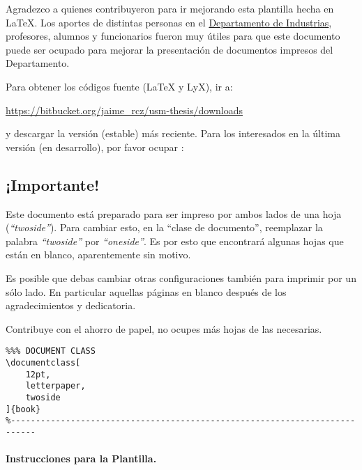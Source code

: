 
	Agradezco a quienes contribuyeron para ir mejorando esta plantilla hecha en \LaTeX{}. Los aportes de distintas personas en el \href{http://www.industrias.usm.cl}{Departamento de Industrias}, profesores, alumnos y funcionarios fueron muy útiles para que este documento puede ser ocupado para mejorar la presentación de documentos impresos del Departamento.

	Para obtener los códigos fuente (\LaTeX{} y LyX), ir a:
	
	\url{https://bitbucket.org/jaime_rcz/usm-thesis/downloads}
	
	y descargar la versión (estable) más reciente. Para los interesados en la última versión (en desarrollo), por favor ocupar :
	


\subsection*{\color{red}¡Importante!}
Este documento está preparado para ser impreso por ambos lados de una hoja (\emph{``twoside''}). Para cambiar esto, en la ``clase de documento'', reemplazar la palabra \emph{``twoside''} por \emph{``oneside''}. Es por esto que encontrará algunas hojas que están en blanco, aparentemente sin motivo.

Es posible que debas cambiar otras configuraciones también para imprimir por un sólo lado. En particular aquellas páginas en blanco después de los agradecimientos y dedicatoria.

Contribuye con el ahorro de papel, no ocupes más hojas de las necesarias.

\begin{Verbatim}[frame=lines, label=\inlinecode{/latex/memoria.tex} (extracto)
				, fontsize=\footnotesize
				, baselinestretch=1
				, formatcom=\color{gray}]
%---------------------------------------------------------------------------
%%% DOCUMENT CLASS
\documentclass[
	12pt,
	letterpaper,
	twoside
]{book}
%---------------------------------------------------------------------------
\end{Verbatim}

\newpage

\paragraph{Instrucciones para la Plantilla.}

